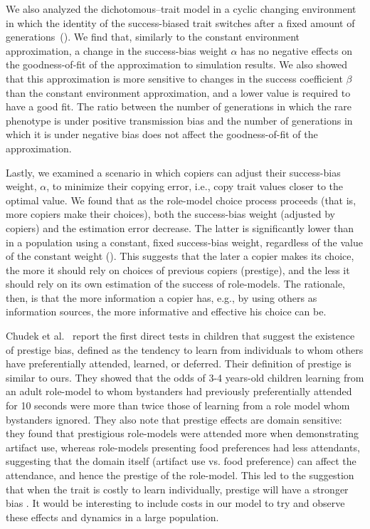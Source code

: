 \documentclass[12pt]{extarticle}
\begin{document}
We also analyzed the dichotomous--trait model in a cyclic changing environment in which the identity of the success-biased trait switches after a fixed amount of generations~().
We find that, similarly to the constant environment approximation, a change in the success-bias weight $\alpha$ has no negative effects on the goodness-of-fit of the approximation to simulation results.
We also showed that this approximation is more sensitive to changes in the success coefficient $\beta$ than the constant environment approximation, and a lower value is required to have a good fit. The ratio between the number of {generations} in which the rare phenotype is under positive transmission bias and the number of generations in which it is under negative bias does not affect the goodness-of-fit of the approximation. 

Lastly, we examined a scenario in which copiers can adjust their success-bias weight, $\alpha$, to minimize their copying error, i.e., copy trait values closer to the optimal value.
We found that as the role-model choice process proceeds (that is, more copiers make their choices), both the success-bias weight (adjusted by copiers) and the estimation error decrease. 
The latter is significantly lower than in a population using a constant, fixed success-bias weight, regardless of the value of the constant weight ().
This suggests that the later a copier makes its choice, the more it should rely on choices of previous copiers (prestige), and the less it should rely on its own estimation of the success of role-models.
The rationale, then, is that the more information a copier has, e.g., by using others as information sources, the more informative and effective his choice can be.

Chudek et al.~\citep{prestige_cultural_learning} report the first direct tests in children that suggest the existence of prestige bias, defined as the tendency to learn from individuals to whom others have preferentially attended, learned, or deferred.
Their definition of prestige is similar to ours. They showed that the odds of 3-4 years-old children learning from an adult role-model to whom bystanders had previously preferentially attended for 10 seconds were more than twice those of learning from a role model whom bystanders ignored.
They also note that prestige effects are domain sensitive: they found that prestigious role-models were attended more when demonstrating artifact use, whereas role-models presenting food preferences had less attendants, suggesting that the domain itself (artifact use vs. food preference) can affect the attendance, and hence the prestige of the role-model.
This led to the suggestion that when the trait is costly to learn individually, prestige will have a stronger bias \citep{prestige_cultural_learning}.
It would be interesting to include costs in our model to try and observe these effects and dynamics in a large population.
\end{document}
